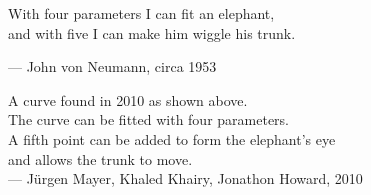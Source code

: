 \begin{flushright}
\begin{hangleftquote}{\QENOpen}{\QENClose}
With four parameters I can fit an elephant,\\
and with five I can make him wiggle his trunk.
\end{hangleftquote}
\par\smallskip
\normalfont — John von Neumann, circa 1953
\end{flushright}

\vspace{0.5em}


\vspace{0.5em}

\begin{flushright}
A curve found in 2010 as shown above.\\
The curve can be fitted with four parameters.\\A fifth point can be added to form the elephant's eye\\and allows the trunk to move.
\\
— Jürgen Mayer, Khaled Khairy, Jonathon Howard, 2010
\end{flushright}
